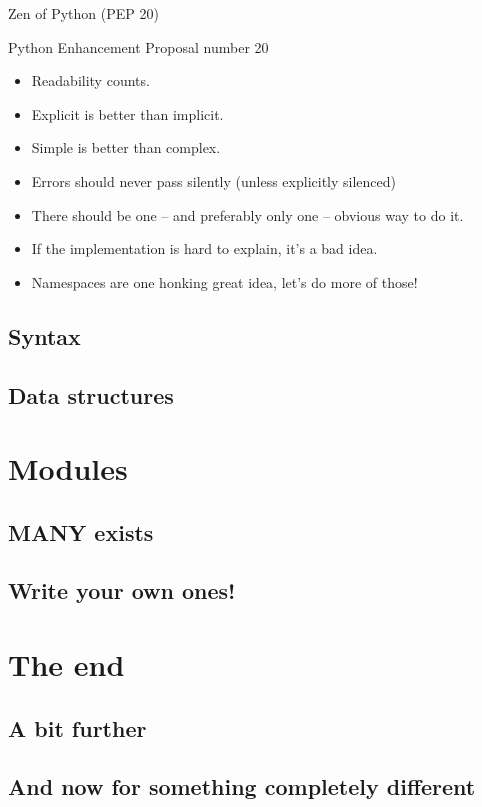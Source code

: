\documentclass[ignorenonframetext,]{beamer}
\begin{document}
\begin{frame}{Zen of Python (PEP 20)}

    Python Enhancement Proposal number 20

    \begin{itemize}[<+-| alert@+>]
        \item Readability counts.
        \item Explicit is better than implicit.
        \item Simple is better than complex.
        \item Errors should never pass silently (unless explicitly silenced)
        \item There should be one -- and preferably only one -- obvious way to do it.
        \item If the implementation is hard to explain, it's a bad idea.
        \item Namespaces are one honking great idea, let's do more of those!
    \end{itemize}
\end{frame}

\subsection{Syntax}\label{basic-syntax}
\subsection{Data structures}\label{data-structures}

\section{Modules}\label{some-useful-modules}
\subsection{MANY exists}
\subsection{Write your own ones!}

\section{The end}
\subsection{A bit further}\label{a-bit-further}
\subsection{And now for something completely different}\label{and-now-for-something-completely-different}
\end{document}

